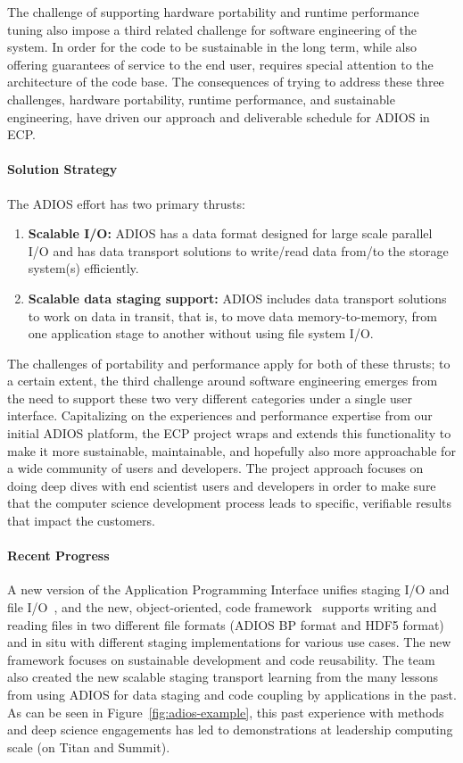 The challenge of supporting hardware portability and runtime performance tuning also impose a third related challenge for software engineering of the system.  In order for the code to be sustainable in the long term, while also offering guarantees of service to the end user, requires special attention to the architecture of the code base.  The consequences of trying to address these three challenges, hardware portability, runtime performance, and sustainable engineering, have driven our approach and deliverable schedule for ADIOS in ECP.

\paragraph{Solution Strategy}

The ADIOS effort has two primary thrusts:
\begin{enumerate}
	\item \textbf{Scalable I/O:} ADIOS has a data format designed for large scale parallel I/O and has data transport solutions to write/read data from/to the storage system(s) efficiently.
	\item \textbf{Scalable data staging support:}  ADIOS includes data transport solutions to work on data in transit, that is, to move data memory-to-memory, from one application stage to another without using file system I/O.
\end{enumerate}

The challenges of portability and performance apply for both of these thrusts; to a certain extent, the third challenge around software engineering emerges from the need to support these two very different categories under a single user interface.  Capitalizing on the experiences and performance expertise from our initial ADIOS platform, the ECP project wraps and extends this functionality to make it more sustainable, maintainable, and hopefully also more approachable for a wide community of users and developers.  The project approach focuses on doing deep dives with end scientist users and developers in order to make sure that the computer science development process leads to specific, verifiable results that impact the customers.


\paragraph{Recent Progress}

A new version of the Application Programming Interface unifies staging I/O and file I/O~\cite{ADIOS2-docs}, and the new, object-oriented, code framework~\cite{ADIOS2-git} supports  writing and reading files in two different file formats (ADIOS BP format and HDF5 format) and in situ with different staging implementations for various use cases. The new framework focuses on sustainable development and code reusability. The team also created the new scalable staging transport learning from the many lessons from using ADIOS for data staging and code coupling by applications in the past. As can be seen in Figure~\ref{fig:adios-example}, this past experience with methods and deep science engagements has led to demonstrations at leadership computing scale (on Titan and Summit).

